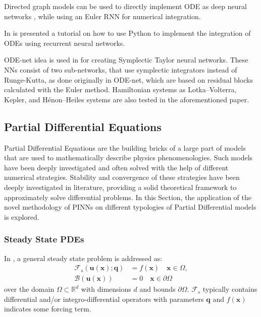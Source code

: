 \documentclass[pdflatex,sn-basic]{sn-jnl}%
\theoremstyle{thmstyleone}%
\theoremstyle{thmstyletwo}%
\theoremstyle{thmstylethree}%
\begin{document}
Directed graph models can be used to directly implement ODE as deep neural networks \citep{Via2021_EstimatingModelInadequacy_NasVNDY}, while using  an Euler RNN for numerical integration.

In \cite{Nas2020_TutorialSolvingOrdinary_FriNFV} is presented a tutorial on how to use Python to implement the integration of ODEs using recurrent neural networks.

ODE-net idea is used in \cite{Ton2021_SymplecticNeuralNetworks_XioTXH} for creating Symplectic Taylor neural networks. These NNs consist of two sub-networks, that use symplectic integrators instead of Runge-Kutta, as done originally in ODE-net, which are based on residual blocks calculated with the Euler method. Hamiltonian systems as Lotka–Volterra,  Kepler, and  Hénon–Heiles systems are also tested in the aforementioned paper.

\subsection{Partial Differential Equations}
Partial Differential Equations are the building bricks of a large part of models that are used to mathematically describe physics phenomenologies. Such models have been deeply investigated and often solved with the help of different numerical strategies. Stability and convergence of these strategies have been deeply investigated in literature, providing a solid theoretical framework to approximately solve differential problems. In this Section, the application of the novel methodology of PINNs on different typologies of Partial Differential models is explored. 

\subsubsection{Steady State PDEs}
In \cite{Kha2021_HpVpinnsVariational_ZhaKZK, Kha2019_VariationalPhysicsInformed_ZhaKZK}, a general steady state problem is addressed as:
\begin{align*}
 \mathcal{F}_s(\bm{u}(\bm{x}); \bm{q}) &= f(\bm{x})  \quad \bm{x}\in \Omega ,
 \\
\mathcal{B}(\bm{u}(\bm{x})) &= 0  \quad \bm{x}\in \partial \Omega
\end{align*}
over the domain $\Omega \subset \mathbb{R}^d$ with dimensions $d$ and bounds $\partial \Omega$.  $\mathcal{F}_s$  typically contains differential and/or integro-differential operators with parameters $\bm{q}$ and $ f(\bm{x})$ indicates some forcing term.
\end{document}
